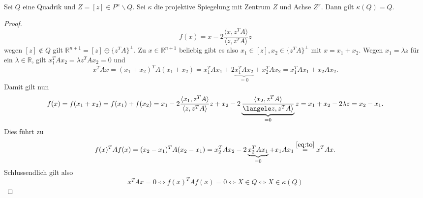 \documentclass[11pt]{article}
\begin{document}
\begin{theorem}
Sei $Q$ eine Quadrik und $Z = [z]\in P^n\backslash Q$. Sei $\kappa$ die projektive Spiegelung mit Zentrum $Z$ und Achse $Z^\pi$. Dann gilt $\kappa(Q) = Q$. 
\end{theorem}
\begin{proof}
\begin{equation*}
    f(x) = x- 2 \frac{\langle x, z^TA\rangle}{\langle z, z^TA\rangle}z
\end{equation*}
wegen $[z]\notin Q$ gilt $\mathbb R^{n+1} = [z]\oplus\{z^TA\}^\perp$. Zu $x\in \mathbb R^{n+1}$ beliebig gibt es also $x_1\in [z], x_2\in \{z^TA\}^\perp$ mit $x = x_1+x_2$. Wegen $x_1 = \lambda z$ für ein $\lambda\in \mathbb R$, gilt $x_1^TAx_2 = \lambda z^TAx_2 = 0$ und \begin{equation}\label{eq:to}
    x^TAx = (x_1+x_2)^TA(x_1+x_2) = x_1^TAx_1 + 2\underbrace{x_1^TAx_2}_{=0} + x_2^TAx_2 = x_1^TAx_1 + x_2Ax_2.
\end{equation}
Damit gilt nun \begin{equation*}
    f(x) = f(x_1+x_2) = f(x_1) + f(x_2) =
       x_1- 2 \frac{\langle x_1, z^TA\rangle}{\langle z, z^TA\rangle}z + x_2- 2 \underbrace{\frac{\langle x_2, z^TA\rangle}{\langele z, z^TA\rangle}}_{=0}z =
       x_1 + x_2 - 2\lambda z = x_2-x_1.
\end{equation*}
Dies führt zu \begin{equation*}
    f(x)^TAf(x) = (x_2-x_1)^TA(x_2-x_1) = x_2^TAx_2 - 2 \underbrace{x_2^TAx_1}_{= 0} + x_1Ax_1 \overset{\eqref{eq:to}}{=} x^TAx.
\end{equation*}
Schlussendlich gilt also \begin{equation*}
    x^TAx = 0\Leftrightarrow f(x)^TAf(x) = 0\Leftrightarrow X\in Q\Leftrightarrow X\in \kappa(Q)
\end{equation*}
\end{proof}
\end{document}
